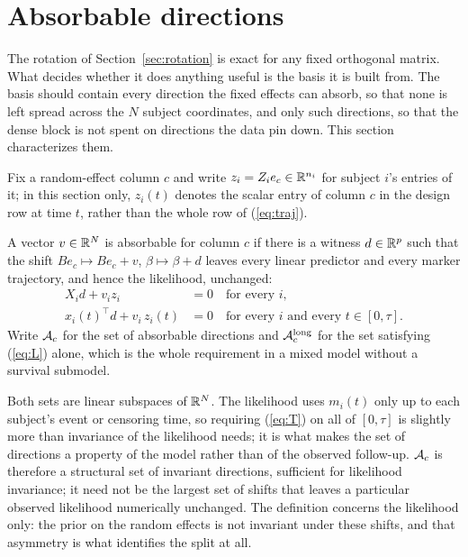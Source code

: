 \section{Absorbable directions}\label{sec:absorbable}

The rotation of Section~\ref{sec:rotation} is exact for any fixed
orthogonal matrix. What decides whether it does anything useful is the
basis it is built from. The basis should contain every direction the
fixed effects can absorb, so that none is left spread across the $N$
subject coordinates, and only such directions, so that the dense block is
not spent on directions the data pin down. This section characterizes them.

Fix a random-effect column $c$ and write $z_i = Z_i e_c \in \mathbb{R}^{n_i}$ for
subject $i$'s entries of it; in this section only, $z_i(t)$ denotes the
scalar entry of column $c$ in the design row at time $t$, rather than the
whole row of (\ref{eq:traj}).

\begin{definition}\label{def:abs}
A vector $v \in \mathbb{R}^N$ is absorbable for column $c$ if there is a witness
$d \in \mathbb{R}^p$ such that the shift $B e_c \mapsto B e_c + v$, $\beta \mapsto
\beta + d$ leaves every linear predictor and every marker trajectory, and
hence the likelihood, unchanged:
\begin{align}
X_i d + v_i z_i &= 0 \quad \text{for every } i, \tag{L}\label{eq:L}\\
x_i(t)^{\top} d + v_i\, z_i(t) &= 0 \quad \text{for every } i
\text{ and every } t \in [0, \tau]. \tag{T}\label{eq:T}
\end{align}
Write $\mathcal{A}_c$ for the set of absorbable directions and $\mathcal{A}_c^{\mathrm{long}}$
for the set satisfying (\ref{eq:L}) alone, which is the whole requirement
in a mixed model without a survival submodel.
\end{definition}

Both sets are linear subspaces of $\mathbb{R}^N$. The likelihood uses $m_i(t)$
only up to each subject's event or censoring time, so requiring
(\ref{eq:T}) on all of $[0, \tau]$ is slightly more than invariance of
the likelihood needs; it is what makes the set of directions a property
of the model rather than of the observed follow-up. $\mathcal{A}_c$ is therefore a
structural set of invariant directions, sufficient for likelihood
invariance; it need not be the largest set of shifts that leaves a
particular observed likelihood numerically unchanged. The definition concerns
the likelihood only: the prior on the random effects is not invariant under
these shifts, and that asymmetry is what identifies the split at all.

